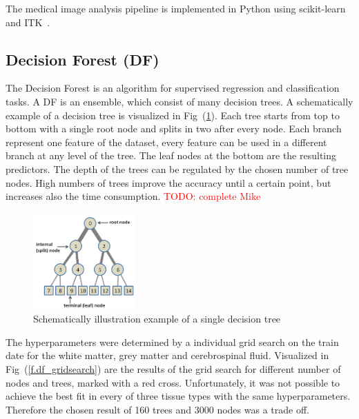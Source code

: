 \documentclass[journal]{IEEEtran}
\newcommand\TODO[1]{\textcolor{red}{TODO: #1}}
\begin{document}
The medical image analysis pipeline is implemented in Python using scikit-learn~\cite{pedregosa2011scikit} and ITK~\cite{yoo2002engineering}.

\subsection{Decision Forest (DF)}
The Decision Forest is an algorithm for supervised regression and classification tasks. A DF is an ensemble, which consist of many decision trees. A schematically example of a decision tree is visualized in Fig~(\ref{f.df}). Each tree starts from top to bottom with a single root node and splits in two after every node. Each branch represent one feature of the dataset, every feature can be used in a different branch at any level of the tree. The leaf nodes at the bottom are the resulting predictors. The depth of the trees can be regulated by the chosen number of tree nodes. High numbers of trees improve the accuracy until a certain point, but increases also the time consumption. \TODO{complete Mike}

\begin{figure}[h!]
	\centering
	\includegraphics[width=0.35\textwidth]{images/DF}
	\caption{Schematically illustration example of a single decision tree}\label{f.df}
\end{figure}


The hyperparameters were determined by a individual grid search on the train date for the white matter, grey matter and cerebrospinal fluid. Visualized in Fig~(\ref{f.df_gridsearch}) are the results of the grid search for different number of nodes and trees, marked with a red cross. Unfortunately, it was not possible to achieve the best fit in every of three tissue types with the same hyperparameters. Therefore the chosen result of 160 trees and 3000 nodes was a trade off.
\end{document}
